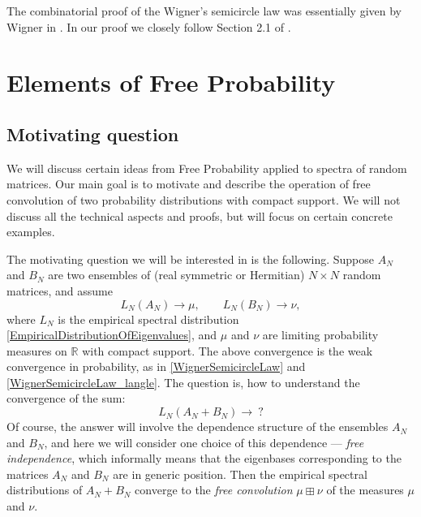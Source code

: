 \documentclass[letterpaper,11pt,oneside,reqno]{amsart}
\numberwithin{equation}{section}
\newcommand{\lect}[1]{}
\theoremstyle{definition}
\begin{document}
The combinatorial proof of the Wigner's semicircle law was essentially given by Wigner 
in \cite{wigner1955characteristic}. In our proof we closely follow Section 2.1 of
\cite{AndersonGuionnetZeitouniBook}.



\lect{2/1/2016}

\section{Elements of Free Probability} %
\label{sec:elements_of_free_probability}

\subsection{Motivating question} %
\label{sub:motivation}

We will discuss certain ideas from Free Probability
applied to spectra of random matrices. 
Our main goal is to motivate and describe the operation of free convolution
of two probability distributions with compact support. 
We will not discuss all the technical aspects and proofs, but will focus on 
certain concrete examples.

The motivating question we will be interested in is the following. Suppose
$A_N$ and $B_N$ are two ensembles of 
(real symmetric or Hermitian) $N\times N$ random matrices, and 
assume
\begin{equation*}
	L_N(A_N)\to\mu,\qquad L_N(B_N)\to\nu,
\end{equation*}
where $L_N$ is the empirical spectral distribution \eqref{EmpiricalDistributionOfEigenvalues}, and $\mu$ and $\nu$ are limiting probability measures on $\mathbb{R}$ with compact support.
The above convergence is the weak convergence in probability, as in 
\eqref{WignerSemicircleLaw} and \eqref{WignerSemicircleLaw_langle}.
The question is, how to understand the convergence of the sum:
\begin{equation*}
	L_N(A_N+B_N)\to\ ?
\end{equation*}
Of course, the answer will involve the dependence structure
of the ensembles $A_N$ and $B_N$, and here we will consider 
one choice of this dependence --- \emph{free independence},
which informally means that the eigenbases corresponding to the matrices
$A_N$ and $B_N$ are in generic position.
Then the empirical spectral distributions of $A_N+B_N$
converge to the \emph{free convolution}
$\mu\boxplus\nu$ of the measures $\mu$ and $\nu$.
\end{document}

